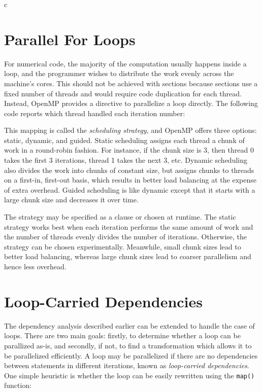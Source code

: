\documentclass[conference, a4paper]{IEEEtran-modified}
\begin{document}
\begin{ccode}[]{c}


\section{Parallel For Loops}

  For numerical code, the majority of the computation usually happens inside a loop, and the programmer wishes to distribute the work evenly across the machine's cores. This should not be achieved with sections because sections use a fixed number of threads and would require code duplication for each thread. Instead, OpenMP provides a directive to parallelize a loop directly. The following code reports which thread handled each iteration number:

      
  This mapping is called the \emph{scheduling strategy}, and OpenMP offers three options: static, dynamic, and guided. Static scheduling assigns each thread a chunk of work in a round-robin fashion. For instance, if the chunk size is 3, then thread 0 takes the first 3 iterations, thread 1 takes the next 3, etc. Dynamic scheduling also divides the work into chunks of constant size, but assigns chunks to threads on a first-in, first-out basis, which results in better load balancing at the expense of extra overhead. Guided scheduling is like dynamic except that it starts with a large chunk size and decreases it over time. 

  The strategy may be specified as a clause or chosen at runtime. The static strategy works best when each iteration performs the same amount of work and the number of threads evenly divides the number of iterations. Otherwise, the strategy can be chosen experimentally. Meanwhile, small chunk sizes lead to better load balancing, whereas large chunk sizes lead to coarser parallelism and hence less overhead.


\section{Loop-Carried Dependencies}

  The dependency analysis described earlier can be extended to handle the case of loops. There are two main goals: firstly, to determine whether a loop can be parallized as-is, and secondly, if not, to find a transformation which allows it to be parallelized efficiently. A loop may be parallelized if there are no dependencies between statements in different iterations, known as \emph{loop-carried dependencies}. One simple heuristic is whether the loop can be easily rewritten using the \texttt{map()} function:


\end{ccode}
\end{document}
